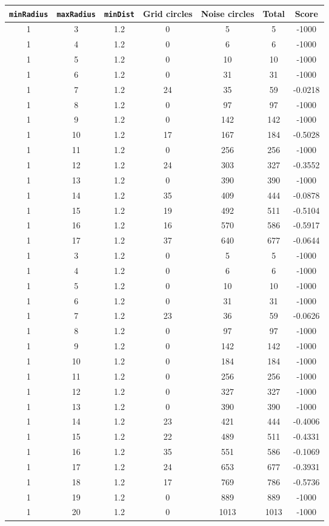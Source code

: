 \documentclass[letterpaper, 12pt]{article}
\begin{document}
\begin{longtable}{|c|c|c|c|c|c|c|}
\hline
\textbf{\texttt{minRadius}} & \textbf{\texttt{maxRadius}} & \textbf{\texttt{minDist}} & \textbf{Grid circles} & \textbf{Noise circles} & \textbf{Total} & \textbf{Score} \\
\hline
1 & 3 & 1.2 & 0 & 5 & 5 & -1000 \\
\hline
1 & 4 & 1.2 & 0 & 6 & 6 & -1000 \\
\hline
1 & 5 & 1.2 & 0 & 10 & 10 & -1000 \\
\hline
1 & 6 & 1.2 & 0 & 31 & 31 & -1000 \\
\hline
1 & 7 & 1.2 & 24 & 35 & 59 & -0.0218 \\
\hline
1 & 8 & 1.2 & 0 & 97 & 97 & -1000 \\
\hline
1 & 9 & 1.2 & 0 & 142 & 142 & -1000 \\
\hline
1 & 10 & 1.2 & 17 & 167 & 184 & -0.5028 \\
\hline
1 & 11 & 1.2 & 0 & 256 & 256 & -1000 \\
\hline
1 & 12 & 1.2 & 24 & 303 & 327 & -0.3552 \\
\hline
1 & 13 & 1.2 & 0 & 390 & 390 & -1000 \\
\hline
1 & 14 & 1.2 & 35 & 409 & 444 & -0.0878 \\
\hline
1 & 15 & 1.2 & 19 & 492 & 511 & -0.5104 \\
\hline
1 & 16 & 1.2 & 16 & 570 & 586 & -0.5917 \\
\hline
1 & 17 & 1.2 & 37 & 640 & 677 & -0.0644 \\
\hline
1 & 3 & 1.2 & 0 & 5 & 5 & -1000 \\
\hline
1 & 4 & 1.2 & 0 & 6 & 6 & -1000 \\
\hline
1 & 5 & 1.2 & 0 & 10 & 10 & -1000 \\
\hline
1 & 6 & 1.2 & 0 & 31 & 31 & -1000 \\
\hline
1 & 7 & 1.2 & 23 & 36 & 59 & -0.0626 \\
\hline
1 & 8 & 1.2 & 0 & 97 & 97 & -1000 \\
\hline
1 & 9 & 1.2 & 0 & 142 & 142 & -1000 \\
\hline
1 & 10 & 1.2 & 0 & 184 & 184 & -1000 \\
\hline
1 & 11 & 1.2 & 0 & 256 & 256 & -1000 \\
\hline
1 & 12 & 1.2 & 0 & 327 & 327 & -1000 \\
\hline
1 & 13 & 1.2 & 0 & 390 & 390 & -1000 \\
\hline
1 & 14 & 1.2 & 23 & 421 & 444 & -0.4006 \\
\hline
1 & 15 & 1.2 & 22 & 489 & 511 & -0.4331 \\
\hline
1 & 16 & 1.2 & 35 & 551 & 586 & -0.1069 \\
\hline
1 & 17 & 1.2 & 24 & 653 & 677 & -0.3931 \\
\hline
1 & 18 & 1.2 & 17 & 769 & 786 & -0.5736 \\
\hline
1 & 19 & 1.2 & 0 & 889 & 889 & -1000 \\
\hline
1 & 20 & 1.2 & 0 & 1013 & 1013 & -1000 \\
\hline
\end{longtable}
\end{document}

